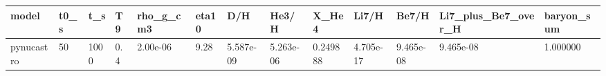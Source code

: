 \begin{tabular}{lllllllllllll}
\toprule
model & t0_s & t_s & T9 & rho_g_cm3 & eta10 & D/H & He3/H & X_He4 & Li7/H & Be7/H & Li7_plus_Be7_over_H & baryon_sum \\
\midrule
pynucastro & 50 & 1000 & 0.4 & 2.00e-06 & 9.28 & 5.587e-09 & 5.263e-06 & 0.249888 & 4.705e-17 & 9.465e-08 & 9.465e-08 & 1.000000 \\
\bottomrule
\end{tabular}
